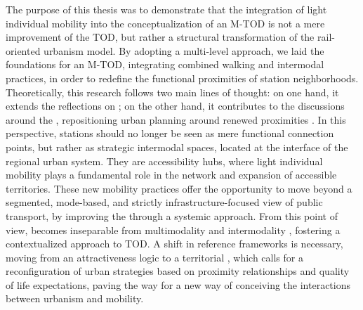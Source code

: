 \begin{refsegment}
The purpose of this thesis was to demonstrate that the integration of light individual mobility into the conceptualization of an \acrfull{M-TOD} is not a mere improvement of the \acrfull{TOD}, but rather a structural transformation of the rail-oriented urbanism model. By adopting a multi-level approach, we laid the foundations for an \acrshort{M-TOD}, integrating combined walking and intermodal practices, in order to redefine the functional proximities of station neighborhoods. Theoretically, this research follows two main lines of thought: on one hand, it extends the reflections on  \textcolor{blue}{\autocite[]{dupuy_urbanisme_1991}}; on the other hand, it contributes to the discussions around the , repositioning urban planning around renewed proximities \textcolor{blue}{\autocites{sheller_new_2006}[8]{sheller_mobilizing_2016}[13]{randell_no_2020}}. In this perspective, stations should no longer be seen as mere functional connection points, but rather as strategic intermodal spaces, located at the interface of the regional urban system. They are accessibility hubs, where light individual mobility plays a fundamental role in the network and expansion of accessible territories. These new mobility practices offer the opportunity to move beyond a segmented, mode-based, and strictly infrastructure-focused view of public transport, by improving the  \textcolor{blue}{\autocite[15]{richer_quelles_2016}} through a systemic  approach. From this point of view,  becomes inseparable from \gls{multimodality} and intermodality \textcolor{blue}{\autocite[91-92]{vincent-geslin__2012}}, fostering a contextualized approach to \acrshort{TOD}. A shift in reference frameworks is necessary, moving from an attractiveness logic to a territorial  \textcolor{blue}{\autocite[2]{talandier_lhospitalite_2023}}, which calls for a reconfiguration of urban strategies based on proximity relationships and quality of life expectations, paving the way for a new way of conceiving the interactions between urbanism and mobility.%


\end{refsegment}
